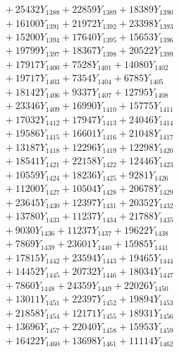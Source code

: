 \documentclass[a4paper,10pt]{article}
\begin{document}
{\begin{align}
&\;  + 25432 Y_{1388} + 22859 Y_{1389} + 18389 Y_{1390} \\[0.3ex]
&\;  + 16100 Y_{1391} + 21972 Y_{1392} + 23398 Y_{1393} \\[0.3ex]
&\;  + 15200 Y_{1394} + 17640 Y_{1395} + 15653 Y_{1396} \\[0.3ex]
&\;  + 19799 Y_{1397} + 18367 Y_{1398} + 20522 Y_{1399} \\[0.3ex]
&\;  + 17917 Y_{1400} + 7528 Y_{1401} + 14080 Y_{1402} \\[0.3ex]
&\;  + 19717 Y_{1403} + 7354 Y_{1404} + 6785 Y_{1405} \\[0.3ex]
&\;  + 18142 Y_{1406} + 9337 Y_{1407} + 12795 Y_{1408} \\[0.5ex]\allowbreak
&\;  + 23346 Y_{1409} + 16990 Y_{1410} + 15775 Y_{1411} \\[0.3ex]
&\;  + 17032 Y_{1412} + 17947 Y_{1413} + 24046 Y_{1414} \\[0.3ex]
&\;  + 19586 Y_{1415} + 16601 Y_{1416} + 21048 Y_{1417} \\[0.3ex]
&\;  + 13187 Y_{1418} + 12296 Y_{1419} + 12298 Y_{1420} \\[0.3ex]
&\;  + 18541 Y_{1421} + 22158 Y_{1422} + 12446 Y_{1423} \\[0.3ex]
&\;  + 10559 Y_{1424} + 18236 Y_{1425} + 9281 Y_{1426} \\[0.3ex]
&\;  + 11200 Y_{1427} + 10504 Y_{1428} + 20678 Y_{1429} \\[0.3ex]
&\;  + 23645 Y_{1430} + 12397 Y_{1431} + 20352 Y_{1432} \\[0.3ex]
&\;  + 13780 Y_{1433} + 11237 Y_{1434} + 21788 Y_{1435} \\[0.3ex]
&\;  + 9030 Y_{1436} + 11237 Y_{1437} + 19622 Y_{1438} \\[0.5ex]\allowbreak
&\;  + 7869 Y_{1439} + 23601 Y_{1440} + 15985 Y_{1441} \\[0.3ex]
&\;  + 17815 Y_{1442} + 23594 Y_{1443} + 19465 Y_{1444} \\[0.3ex]
&\;  + 14452 Y_{1445} + 20732 Y_{1446} + 18034 Y_{1447} \\[0.3ex]
&\;  + 7860 Y_{1448} + 24359 Y_{1449} + 22026 Y_{1450} \\[0.3ex]
&\;  + 13011 Y_{1451} + 22397 Y_{1452} + 19894 Y_{1453} \\[0.3ex]
&\;  + 21858 Y_{1454} + 12171 Y_{1455} + 18931 Y_{1456} \\[0.3ex]
&\;  + 13696 Y_{1457} + 22040 Y_{1458} + 15953 Y_{1459} \\[0.3ex]
&\;  + 16422 Y_{1460} + 13698 Y_{1461} + 11114 Y_{1462} \\[0.3ex]

\end{align}}
\end{document}

